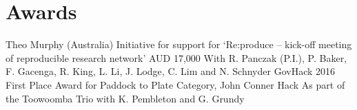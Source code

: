 \section*{Awards}
  \begin{entrylist}
		{Theo Murphy (Australia) Initiative for support for ‘Re:produce – kick-off meeting of reproducible research network’}
		{AUD 17,000}
		{With R. Panczak (P.I.), P. Baker, F. Gacenga, R. King, L. Li, J. Lodge, C. Lim and N. Schnyder}
    	{GovHack 2016 First Place Award for Paddock to Plate Category, John Conner Hack}
    	{}
    	{As part of the Toowoomba Trio with K. Pembleton and G. Grundy}
  \end{entrylist}
